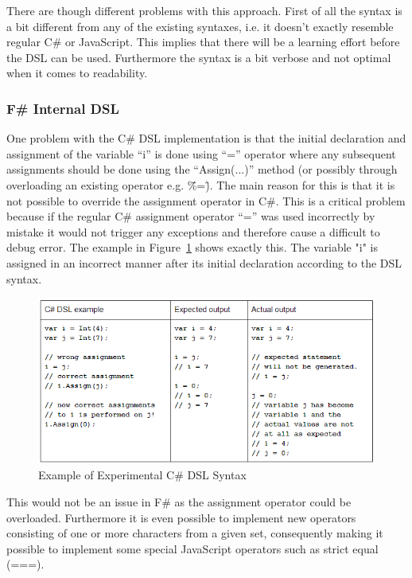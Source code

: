 			There are though different problems with this approach. First of all the syntax is a bit different from any of the existing syntaxes, i.e. it doesn’t exactly resemble regular C\# or JavaScript. This implies that there will be a learning effort before the DSL can be used. Furthermore the syntax is a bit verbose and not optimal when it comes to readability.

		\subsubsection{F\# Internal DSL}
			One problem with the C\# DSL implementation is that the initial declaration and assignment of the variable “i” is done using “=” operator where any subsequent assignments should be done using the “Assign(...)” method (or possibly through overloading an existing operator e.g. \"\%=\"). The main reason for this is that it is not possible to override the assignment operator in C\#. This is a critical problem because if the regular C\# assignment operator “=” was used incorrectly by mistake it would not trigger any exceptions and therefore cause a difficult to debug error. The example in Figure~\ref{kiwiProblems} shows exactly this. The variable "i" is assigned in an incorrect manner after its initial declaration according to the DSL syntax.

			\begin{figure}
				\begin{center}
					\centerline{\includegraphics[width=14cm]{resources/images/kiwiProblems.png}}
				\end{center}
				\caption{Example of Experimental C\# DSL Syntax}
				\label{kiwiProblems}
			\end{figure}

			This would not be an issue in F\# as the assignment operator could be overloaded. Furthermore it is even possible to implement new operators consisting of one or more characters from a given set, consequently making it possible to implement some special JavaScript operators such as strict equal (===).

